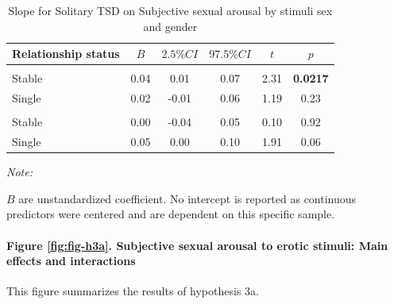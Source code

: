 \documentclass[
  bookmarksnumbered]{article}
\begin{document}
\begin{table}[H]
\centering
\caption{\label{tab:unnamed-chunk-29}Slope for Solitary TSD on 
        Subjective sexual arousal by stimuli sex and gender}
\centering
\begin{threeparttable}
\begin{tabular}[t]{lccccc}
\toprule
Relationship status & $B$ & $2.5\% CI$ & $97.5\% CI$ & $t$ & $p$\\
\midrule
\addlinespace[0.3em]
\multicolumn{6}{l}{\cellcolor{lightgray}{Gender: Women}}\\
\hspace{1em}Stable & 0.04 & 0.01 & 0.07 & 2.31 & \textbf{0.0217}\\
\hspace{1em}Single & 0.02 & -0.01 & 0.06 & 1.19 & 0.23\\
\addlinespace[0.3em]
\multicolumn{6}{l}{\cellcolor{lightgray}{Gender: Men}}\\
\hspace{1em}Stable & 0.00 & -0.04 & 0.05 & 0.10 & 0.92\\
\hspace{1em}Single & 0.05 & 0.00 & 0.10 & 1.91 & 0.06\\
\bottomrule
\end{tabular}
\begin{tablenotes}[para]
\item \textit{Note: } 
\item $B$ are unstandardized coefficient.
           No intercept is reported as continuous predictors were centered
           and are dependent on this specific sample.
\end{tablenotes}
\end{threeparttable}
\end{table}

\paragraph{Figure \ref{fig:fig-h3a}. Subjective sexual arousal to erotic stimuli: Main effects and interactions}\label{figure-reffigfig-h3a.-subjective-sexual-arousal-to-erotic-stimuli-main-effects-and-interactions}

This figure summarizes the results of hypothesis 3a.
\end{document}
